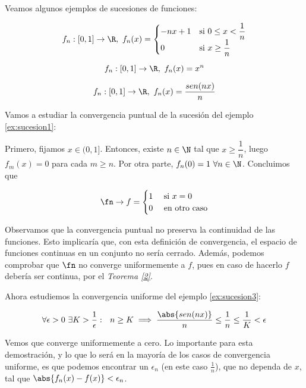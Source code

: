 Veamos algunos ejemplos de sucesiones de funciones:

\begin{ejemplo} \label{ex:sucesion1}
  \[
    f_n : [0,1] \to \R,\ f_n(x) = \begin{cases}
    -nx+1 & \text{si }  0\le x < \dfrac{1}{n}\\
    0     & \text{si }  x\ge \dfrac{1}{n}
    \end{cases}
  \]
\end{ejemplo}

\begin{ejemplo}
  \[
    f_n : [0,1] \to \R,\ f_n(x) = x^n
  \]
\end{ejemplo}

\begin{ejemplo} \label{ex:sucesion3}
  \[
    f_n : [0,1] \to \R,\ f_n(x) = \dfrac{sen(nx)}{n}
  \]
\end{ejemplo}

Vamos a estudiar la convergencia puntual de la sucesión del ejemplo \ref{ex:sucesion1}:

Primero, fijamos $x\in (0,1]$. Entonces, existe $n\in \N$ tal que $x \ge \dfrac{1}{n}$, luego $f_m(x) = 0$ para cada $m\ge n$. Por otra parte, $f_n(0) = 1\ \forall n\in \N$. Concluimos que

\[
  \fn\to f = \begin{cases}
    1 & \text{ si } x=0\\
    0 & \text{ en otro caso}
  \end{cases}
\]

Observamos que la convergencia puntual no preserva la continuidad de las funciones. Esto implicaría que, con esta definición de convergencia, el espacio de funciones continuas en un conjunto no sería cerrado. Además, podemos comprobar que $\fn$ no converge uniformemente a $f$, pues en caso de hacerlo $f$ debería ser continua, por el \textit{Teorema \ref{2}}.

Ahora estudiemos la convergencia uniforme del ejemplo \ref{ex:sucesion3}:

\[
  \forall\epsilon>0\ \exists K>\dfrac{1}{\epsilon}:\ \ n\ge K \implies \dfrac{\abs{sen(nx)}}{n} \le \dfrac{1}{n} \le \dfrac{1}{K} < \epsilon
\]

Vemos que converge uniformemente a cero. Lo importante para esta demostración, y lo que lo será en la mayoría de los casos de convergencia uniforme, es que podemos encontrar un $\epsilon_n$ (en este caso $\frac{1}{n}$), que no dependa de $x$, tal que $\abs{f_n(x)-f(x)} < \epsilon_n$.

